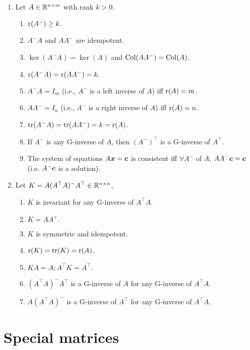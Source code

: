 \documentclass[10pt,a4paper]{book}
\begin{document}
\begin{thmbox}
	\begin{theorem}\label{thm:gen_inv}
		\
		\begin{enumerate}
			\item Let $A\in\mathbb R^{n\times m}$ with rank $k>0$.
			\begin{enumerate}
				\item $\mathrm{r}( A^- ) \geq k.$
				\item $A^-A$ and $AA^-$ are idempotent.
				\item $\ker(A^- A)=\ker(A)$ and $\mathrm{Col}(AA^-)=\mathrm{Col}(A)$. 
				\item $\mathrm{r}( A^- A) = \mathrm{r}( AA^- ) = k.$
				\item $A^- A= I_m$ (i.e., $A^-$ is a left inverse of $A$) iff $\mathrm{r}(A)=m$.  
				\item $AA^-=I_n$ (i.e., $A^-$ is a right inverse of $A$) iff $\mathrm{r}(A)=n$.
				\item $\mathrm{tr}(A^-A)=\mathrm{tr}(AA^-)=k=\mathrm{r}(A)$.
				\item If $A^-$ is any G-inverse of $A$, then $(A^-)^\top$ is a G-inverse of $A^\top$.
				\item The system of equations $A{\boldsymbol x}={\boldsymbol c}$ is consistent iff $\forall A^-$ of $A$, $AA^-{\boldsymbol c}={\boldsymbol c}$ (i.e. $A^-{\boldsymbol c}$ is a solution).    
			\end{enumerate}
			\item Let $K=A(A^\top A)^-A^\top\in\mathbb R^{n\times n}$,
			\begin{enumerate}
				\item $K$ is invariant for any G-inverse of $A^\top A.$
				\item $K= AA^{+ }.$ 
				\item $K$ is symmetric and idempotent. 
				\item $\mathrm{r}(K)=\mathrm{tr}(K)=\mathrm{r}(A)$.
				\item $KA=A;A^\top K=A^\top.$ 
				\item $(A^\top A)^-A^\top$ is a G-inverse of $A$ for any G-inverse of $A^\top A.$ 
				\item $A(A^\top A)^-$ is a G-inverse of $A^\top$ for any G-inverse of $A^\top A.$
			\end{enumerate}
		\end{enumerate} 
	\end{theorem}
\end{thmbox}

\section{Special matrices}\label{sec:spec_mat}
\end{document}
